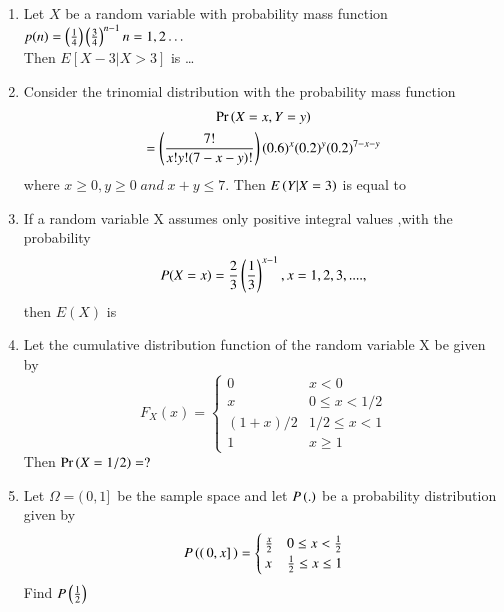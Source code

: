 \begin{enumerate}[label=\thesection.\arabic*.,ref=\thesection.\theenumi]
%
\item Let $X$ be a random variable with probability mass function 
$p(n) = \left(\frac{1}{4}\right)\left(\frac{3}{4}\right)^{n-1}  n=1,2 \ldots $ \\
Then $E[X-3|X>3]$ is \dots
\\
\solution

%
\item Consider the trinomial distribution with the probability mass function 
\begin{multline}
    \nonumber \Pr\left(X=x,Y=y\right)\\=\left(\frac{7!}{x!y!(7-x-y)!}\right)(0.6)^x(0.2)^y(0.2)^{7-x-y}
\end{multline}
where $x\geq0 , y\geq0 \;and\; {x+y}\leq7$.
Then $E\left(Y|X=3\right)$ is equal to
%
\\
\solution

%
\item If a random variable X assumes only positive integral values ,with the probability
\begin{equation}
 P(X=x)=\frac{2}{3}\left(\frac{1}{3}\right)^{x-1},x=1,2,3,....,   
\end{equation}
then $E(X)$ is 
\begin{enumerate}
\end{enumerate}
  \solution
  
  \item     Let the cumulative distribution function of the random variable X be given by 
  $$F_{X}(x)=\left\{
  \begin{array}{ll}
    0 & x<0 \\
    x & 0\leq x<1/2\\
    (1+x)/2 & 1/2\leq x <1\\
    1 & x\geq 1
  \end{array} 
  \right. $$
  Then $\Pr\left(X=1/2\right)=?$
%
\solution

%
\item Let $\Omega = (\,0,1]\,$ be the sample space and let $P\left(.\right)$ be a probability distribution given by\\
\begin{align}
P\left((\,0,x]\,\right) = 
\begin{cases}
   \frac{x}{2} & 0 \le x < \frac{1}{2}\\
   x & \frac{1}{2} \le x \le 1
\end{cases}
\end{align}
Find $P\left(\frac{1}{2}\right)$
\\
\solution
  


\end{enumerate}
